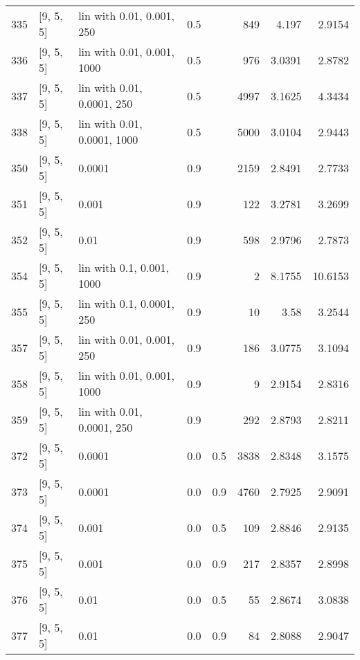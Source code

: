 \begin{longtable}{lllrrrrr}
  335 &          [9, 5, 5] &   lin with 0.01, 0.001, 250 &      0.5 &     &  849 &    4.197 &   2.9154 \\
  336 &          [9, 5, 5] &  lin with 0.01, 0.001, 1000 &      0.5 &     &  976 &   3.0391 &   2.8782 \\
  337 &          [9, 5, 5] &  lin with 0.01, 0.0001, 250 &      0.5 &     & 4997 &   3.1625 &   4.3434 \\
  338 &          [9, 5, 5] & lin with 0.01, 0.0001, 1000 &      0.5 &     & 5000 &   3.0104 &   2.9443 \\
  350 &          [9, 5, 5] &                      0.0001 &      0.9 &     & 2159 &   2.8491 &   2.7733 \\
  351 &          [9, 5, 5] &                       0.001 &      0.9 &     &  122 &   3.2781 &   3.2699 \\
  352 &          [9, 5, 5] &                        0.01 &      0.9 &     &  598 &   2.9796 &   2.7873 \\
  354 &          [9, 5, 5] &   lin with 0.1, 0.001, 1000 &      0.9 &     &    2 &   8.1755 &  10.6153 \\
  355 &          [9, 5, 5] &   lin with 0.1, 0.0001, 250 &      0.9 &     &   10 &     3.58 &   3.2544 \\
  357 &          [9, 5, 5] &   lin with 0.01, 0.001, 250 &      0.9 &     &  186 &   3.0775 &   3.1094 \\
  358 &          [9, 5, 5] &  lin with 0.01, 0.001, 1000 &      0.9 &     &    9 &   2.9154 &   2.8316 \\
  359 &          [9, 5, 5] &  lin with 0.01, 0.0001, 250 &      0.9 &     &  292 &   2.8793 &   2.8211 \\
  372 &          [9, 5, 5] &                      0.0001 &      0.0 & 0.5 & 3838 &   2.8348 &   3.1575 \\
  373 &          [9, 5, 5] &                      0.0001 &      0.0 & 0.9 & 4760 &   2.7925 &   2.9091 \\
  374 &          [9, 5, 5] &                       0.001 &      0.0 & 0.5 &  109 &   2.8846 &   2.9135 \\
  375 &          [9, 5, 5] &                       0.001 &      0.0 & 0.9 &  217 &   2.8357 &   2.8998 \\
  376 &          [9, 5, 5] &                        0.01 &      0.0 & 0.5 &   55 &   2.8674 &   3.0838 \\
  377 &          [9, 5, 5] &                        0.01 &      0.0 & 0.9 &   84 &   2.8088 &   2.9047 \\

\end{longtable}
